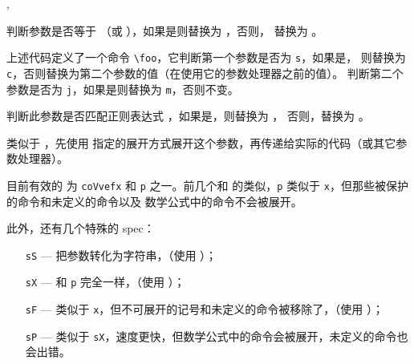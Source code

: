\documentclass[twoside]{book}
\def\xampletext{\par}
\def\xampleprint{\xamplecode \xampleline \xampletext}
\begin{document}
\begin{function}{\ReplaceArgumentIfEqual,\ReplaceArgumentIfStrEqual}
  \begin{syntax}
    \V\ReplaceArgumentIfEqual    {}  
    \V\ReplaceArgumentIfStrEqual {}  
  \end{syntax}
判断参数是否等于 （或 ），如果是则替换为 ，否则，
替换为 。
\end{function}


上述代码定义了一个命令 \verb|\foo|，它判断第一个参数是否为 \verb|s|，如果是，
则替换为 \verb|c|，否则替换为第二个参数的值（在使用它的参数处理器之前的值）。
判断第二个参数是否为 \verb|j|，如果是则替换为 \verb|m|，否则不变。

\begin{function}{\ReplaceArgumentIfMatch}
  \begin{syntax}
    \V\ReplaceArgumentIfMatch {}  
  \end{syntax}
判断此参数是否匹配正则表达式 ，如果是，则替换为 ，
否则，替换为 。
\end{function}

\begin{function}{\ExpandArgument}
  \begin{syntax}
    \V\ExpandArgument {}
  \end{syntax}
类似于 ，先使用  指定的展开方式展开这个参数，再传递给实际的代码（或其它参数处理器）。

目前有效的  为 \verb|coVvefx| 和 \verb|p| 之一。前几个和 
的类似，\verb|p| 类似于 \verb|x|，但那些被保护的命令和未定义的命令以及
数学公式中的命令不会被展开。

此外，还有几个特殊的 spec：
\begin{itemize}
  \item[\texttt{sS}] --- 把参数转化为字符串，（使用 ）；
  \item[\texttt{sX}] --- 和 \verb|p| 完全一样，（使用 ）；
  \item[\texttt{sF}] --- 类似于 \verb|x|，但不可展开的记号和未定义的命令被移除了，（使用 ）；
  \item[\texttt{sP}] --- 类似于 \verb|sX|，速度更快，但数学公式中的命令会被展开，未定义的命令也会出错。
\end{itemize}
\end{function}
\end{document}
